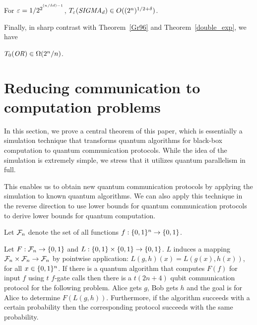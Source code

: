 \begin{theorem}\label{double_exp}
For $\varepsilon = 1 / 2^{2^{{}^{(n/ \delta d)-1}}}$, 
$T_{\varepsilon}(\mbox{\it SIGMA}_d) \in O((2^n)^{1/2 + \delta})$.
\end{theorem}

\ni Finally, in sharp contrast with Theorem~\ref{Gr96} and 
Theorem~\ref{double_exp}, we have 

\begin{theorem}\label{errorless}
$T_0(\mbox{\it OR\/}) \in \Omega(2^n/n)$.
\end{theorem}

\section{Reducing communication to computation 
problems}\label{reduction}

In this section, we prove a central theorem of this paper, which is 
essentially a simulation technique that transforms quantum algorithms 
for black-box computation to quantum communication protocols.
While the idea of the simulation is extremely simple, we stress that
it utilizes quantum parallelism in full.

This enables us to obtain new quantum communication protocols by 
applying the simulation to known quantum algorithms.
We can also apply this technique in the reverse direction to 
use lower bounds for quantum communication protocols to derive 
lower bounds for quantum computation.

Let ${\cal F}_n$ denote the set of all functions $f : \01^n \rightarrow \01$.

\begin{theorem}\label{thm:simulation}
Let $F : \F_n \rightarrow \01$ and 
$L : \01 \x \01 \rightarrow \01$.
$L$ induces a mapping ${\cal F}_n \times {\cal F} _n\rightarrow {\cal F}_n$ by 
pointwise application: $L(g,h)(x) = L(g(x),h(x))$, for all $x \in \01^n$.
If there is a quantum algorithm that computes $F(f)$ for input $f$ 
using $t$ $f$-gate calls then there is a $t(2n+4)$ qubit communication 
protocol for the following problem.
Alice gets $g$, Bob gets $h$ and the goal is for Alice to determine 
$F(L(g,h))$.
Furthermore, if the algorithm succeeds with a certain probability 
then the corresponding protocol succeeds with the same probability.
\end{theorem}

